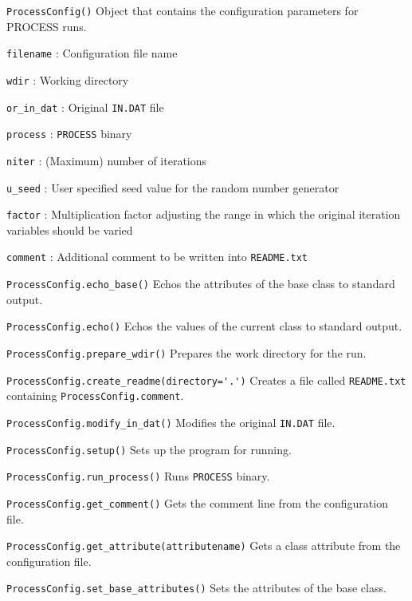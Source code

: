 \documentclass[11pt,a4paper]{article}
\newcommand{\indat}{\mbox{\texttt{IN.DAT}}}
\newcommand{\process}{\mbox{\texttt{PROCESS}}}
\begin{document}
\begin{description}

\item{\verb|ProcessConfig()|} Object that contains the configuration
  parameters for PROCESS runs.

  \verb|filename| : Configuration file name

  \verb|wdir| : Working directory

  \verb|or_in_dat| : Original \indat\/ file

  \verb|process| : \process\/ binary

  \verb|niter| : (Maximum) number of iterations

  \verb|u_seed| : User specified seed value for the random number generator

  \verb|factor| : Multiplication factor adjusting the range in which the
  original iteration variables should be varied

  \verb|comment| : Additional comment to be written into \verb|README.txt|

\item{\verb|ProcessConfig.echo_base()|} Echos the attributes of the base class
  to standard output.

\item{\verb|ProcessConfig.echo()|} Echos the values of the current class to
  standard output.

\item{\verb|ProcessConfig.prepare_wdir()|} Prepares the work directory for the
  run.

\item{\verb|ProcessConfig.create_readme(directory='.')|} Creates a file called
  \texttt{README.txt} containing \texttt{ProcessConfig.comment}.

\item{\verb|ProcessConfig.modify_in_dat()|} Modifies the original \indat\/
  file.

\item{\verb|ProcessConfig.setup()|} Sets up the program for running.

\item{\verb|ProcessConfig.run_process()|} Runs \process\/ binary.

\item{\verb|ProcessConfig.get_comment()|} Gets the comment line from the
  configuration file.

\item{\verb|ProcessConfig.get_attribute(attributename)|} Gets a class
  attribute from the configuration file.

\item{\verb|ProcessConfig.set_base_attributes()|} Sets the attributes of the
  base class.

\end{description}
\end{document}
